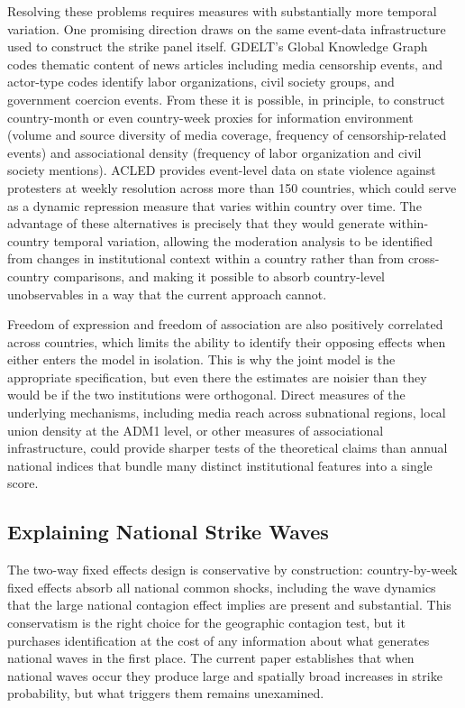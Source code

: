 \documentclass[
  11pt,
]{article}
\begin{document}
Resolving these problems requires measures with substantially more
temporal variation. One promising direction draws on the same event-data
infrastructure used to construct the strike panel itself. GDELT's Global
Knowledge Graph codes thematic content of news articles including media
censorship events, and actor-type codes identify labor organizations,
civil society groups, and government coercion events. From these it is
possible, in principle, to construct country-month or even country-week
proxies for information environment (volume and source diversity of
media coverage, frequency of censorship-related events) and
associational density (frequency of labor organization and civil society
mentions). ACLED provides event-level data on state violence against
protesters at weekly resolution across more than 150 countries, which
could serve as a dynamic repression measure that varies within country
over time. The advantage of these alternatives is precisely that they
would generate within-country temporal variation, allowing the
moderation analysis to be identified from changes in institutional
context within a country rather than from cross-country comparisons, and
making it possible to absorb country-level unobservables in a way that
the current approach cannot.

Freedom of expression and freedom of association are also positively
correlated across countries, which limits the ability to identify their
opposing effects when either enters the model in isolation. This is why
the joint model is the appropriate specification, but even there the
estimates are noisier than they would be if the two institutions were
orthogonal. Direct measures of the underlying mechanisms, including
media reach across subnational regions, local union density at the ADM1
level, or other measures of associational infrastructure, could provide
sharper tests of the theoretical claims than annual national indices
that bundle many distinct institutional features into a single score.

\subsection{Explaining National Strike
Waves}\label{explaining-national-strike-waves}

The two-way fixed effects design is conservative by construction:
country-by-week fixed effects absorb all national common shocks,
including the wave dynamics that the large national contagion effect
implies are present and substantial. This conservatism is the right
choice for the geographic contagion test, but it purchases
identification at the cost of any information about what generates
national waves in the first place. The current paper establishes that
when national waves occur they produce large and spatially broad
increases in strike probability, but what triggers them remains
unexamined.
\end{document}
